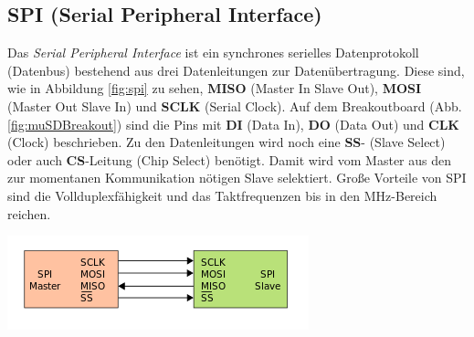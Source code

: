 \subsection{SPI (Serial Peripheral Interface)}
\label{subsubsec:spi}
\begin{minipage}{0.48\textwidth}
Das \textit{Serial Peripheral Interface} ist ein synchrones serielles Datenprotokoll (Datenbus) bestehend aus drei Datenleitungen zur Datenübertragung. Diese sind, wie in Abbildung \ref{fig:spi} zu sehen, \textbf{MISO} (Master In Slave Out), \textbf{MOSI} (Master Out Slave In) und \textbf{SCLK} (Serial Clock). Auf dem Breakoutboard (Abb. \ref{fig:muSDBreakout}) sind die Pins mit \textbf{DI} (Data In), \textbf{DO} (Data Out) und \textbf{CLK} (Clock) beschrieben. Zu den Datenleitungen wird noch eine \textbf{SS}- (Slave Select) oder auch \textbf{CS}-Leitung (Chip Select) benötigt. Damit wird vom Master aus den zur momentanen Kommunikation nötigen Slave selektiert. Große Vorteile von SPI sind die Vollduplexfähigkeit und das Taktfrequenzen bis in den MHz-Bereich reichen. \cite{spi}\cite{Wikipedia2018spi}\\
\end{minipage}
\begin{minipage}{0.51\textwidth}
\centering
\includegraphics[width=\textwidth]{graphics/Datenspeicherung/spi_master_slave.png}
\label{fig:spi}
\end{minipage}